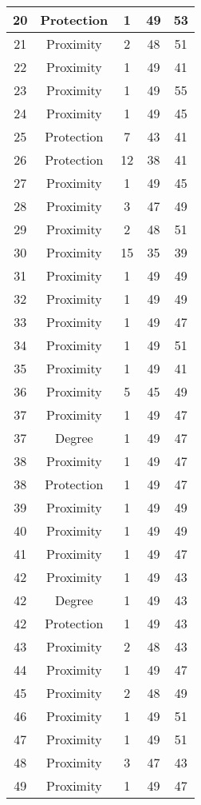 \documentclass[results.tex]{subfiles}
\begin{document}
\begin{center}
\begin{tabular}{| c || c | c | c | c |}
    \hline
    20 & Protection & 1 & 49 & 53 \\ 
    \hline
    21 & Proximity & 2 & 48 & 51 \\ 
    \hline
    22 & Proximity & 1 & 49 & 41 \\ 
    \hline
    23 & Proximity & 1 & 49 & 55 \\ 
    \hline
    24 & Proximity & 1 & 49 & 45 \\ 
    \hline
    25 & Protection & 7 & 43 & 41 \\ 
    \hline
    26 & Protection & 12 & 38 & 41 \\ 
    \hline
    27 & Proximity & 1 & 49 & 45 \\ 
    \hline
    28 & Proximity & 3 & 47 & 49 \\ 
    \hline
    29 & Proximity & 2 & 48 & 51 \\ 
    \hline
    30 & Proximity & 15 & 35 & 39 \\ 
    \hline
    31 & Proximity & 1 & 49 & 49 \\ 
    \hline
    32 & Proximity & 1 & 49 & 49 \\ 
    \hline
    33 & Proximity & 1 & 49 & 47 \\ 
    \hline
    34 & Proximity & 1 & 49 & 51 \\ 
    \hline
    35 & Proximity & 1 & 49 & 41 \\ 
    \hline
    36 & Proximity & 5 & 45 & 49 \\ 
    \hline
    37 & Proximity & 1 & 49 & 47 \\ 
    \hline
    37 & Degree & 1 & 49 & 47 \\ 
    \hline
    38 & Proximity & 1 & 49 & 47 \\ 
    \hline
    38 & Protection & 1 & 49 & 47 \\ 
    \hline
    39 & Proximity & 1 & 49 & 49 \\ 
    \hline
    40 & Proximity & 1 & 49 & 49 \\ 
    \hline
    41 & Proximity & 1 & 49 & 47 \\ 
    \hline
    42 & Proximity & 1 & 49 & 43 \\ 
    \hline
    42 & Degree & 1 & 49 & 43 \\ 
    \hline
    42 & Protection & 1 & 49 & 43 \\ 
    \hline
    43 & Proximity & 2 & 48 & 43 \\ 
    \hline
    44 & Proximity & 1 & 49 & 47 \\ 
    \hline
    45 & Proximity & 2 & 48 & 49 \\ 
    \hline
    46 & Proximity & 1 & 49 & 51 \\ 
    \hline
    47 & Proximity & 1 & 49 & 51 \\ 
    \hline
    48 & Proximity & 3 & 47 & 43 \\ 
    \hline
    49 & Proximity & 1 & 49 & 47 \\ 
    \hline   \end{tabular}
\end{center}
\end{document}
